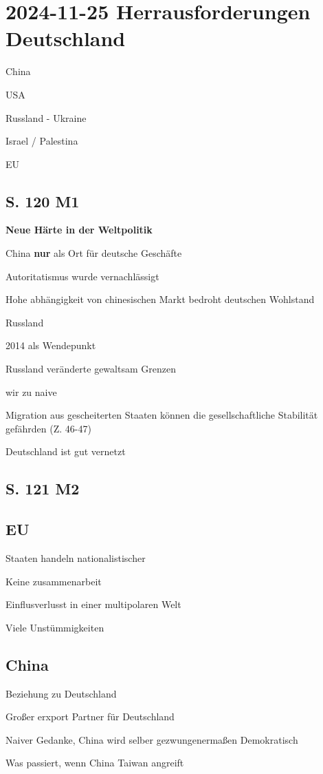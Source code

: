 \section{2024-11-25 Herrausforderungen Deutschland}

\startitemize[packed]
\item China
\item USA
\item Russland - Ukraine
\item Israel / Palestina
\item EU
\stopitemize

\subsection{S. 120 M1}

{\bf Neue Härte in der Weltpolitik}


\startitemize[packed]
\item China {\bf nur} als Ort für deutsche Geschäfte
\startitemize[packed]
\item Autoritatismus wurde vernachlässigt
\item Hohe abhängigkeit von chinesischen Markt bedroht deutschen Wohlstand
\stopitemize
\item Russland
\startitemize[packed]
\item 2014 als Wendepunkt
\item Russland veränderte gewaltsam Grenzen
\item wir zu naive
\stopitemize
\item Migration aus gescheiterten Staaten können die gesellschaftliche Stabilität gefährden (Z. 46-47)
\item Deutschland ist gut vernetzt
\stopitemize

\subsection{S. 121 M2}

\subsection{EU}

\startitemize[packed]
\item Staaten handeln nationalistischer
\item Keine zusammenarbeit
\item Einflusverlusst in einer multipolaren Welt
\item Viele Unstümmigkeiten
\stopitemize

\subsection{China}

\startitemize[packed]
\item  Beziehung zu Deutschland
\startitemize[packed]
\item Großer erxport Partner für Deutschland
\stopitemize
\item Naiver Gedanke, China wird selber gezwungenermaßen Demokratisch
\item Was passiert, wenn China Taiwan angreift
\stopitemize
